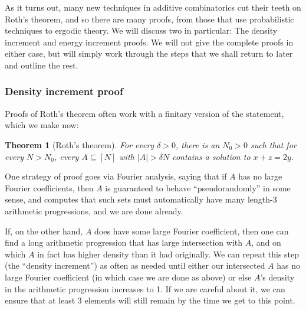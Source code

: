 \documentclass{article}
\newtheorem{theorem}{Theorem}[section]
\theoremstyle{definition}
\theoremstyle{remark}
\numberwithin{equation}{section}
\begin{document}
As it turns out, many new techniques in additive combinatorics cut
their teeth on Roth's theorem, and so there are many proofs, from
those that use probabilistic techniques to ergodic theory.  We will
discuss two in particular: The density increment and energy increment
proofs.  We will not give the complete proofs in either case, but will
simply work through the steps that we shall return to later and
outline the rest.

\subsubsection{Density increment proof}

Proofs of Roth's theorem often work with a finitary version of the
statement, which we make now:

\begin{theorem}[Roth's theorem]
  For every $\delta > 0$, there is an $N_0 > 0$ such that for every
  $N > N_0$, every $A \subseteq [N]$ with $|A| > \delta N$ contains a
  solution to $x+z=2y$.
\end{theorem}

One strategy of proof goes via Fourier analysis, saying that if $A$
has no large Fourier coefficients, then $A$ is guaranteed to behave
``pseudorandomly'' in some sense, and computes that such sets must
automatically have many length-3 arithmetic progressions, and we are
done already.  

If, on the other hand, $A$ does have some large Fourier coefficient,
then one can find a long arithmetic progression that has large
intersection with $A$, and on which $A$ in fact has higher density
than it had originally.  We can repeat this step (the ``density
increment'') as often as needed until either our intersected $A$ has
no large Fourier coefficient (in which case we are done as above) or
else $A$'s density in the arithmetic progression increases to 1.  If
we are careful about it, we can ensure that at least 3 elements will
still remain by the time we get to this point.
\end{document}
